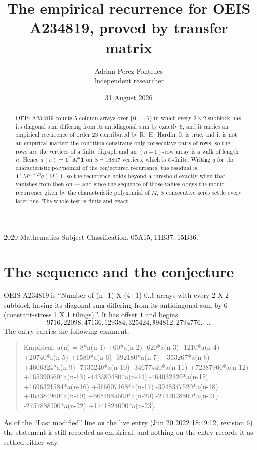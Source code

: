 \documentclass[11pt,a4paper]{article}
\title{The empirical recurrence for OEIS A234819, proved by transfer matrix}
\author{Adrian Perez Fontelles\\ \small Independent researcher}
\date{31 August 2026}
\theoremstyle{plain}
\theoremstyle{definition}
\begin{document}
\maketitle

\begin{abstract}
OEIS A234819 counts $5$-column arrays over $\{0,\dots,6\}$ in which every
$2\times2$ subblock has its diagonal sum differing from its antidiagonal sum by
exactly $6$, and it
carries an empirical recurrence of order $23$ contributed by R.~H.~Hardin. It is true,
and it is not an empirical matter: the condition constrains only consecutive pairs of rows,
so the rows are the vertices of a finite digraph and an $(n+1)$-row array is a walk of
length $n$. Hence $a(n)=\mathbf{1}^{\!\top}M^{n}\mathbf{1}$ on $S=16807$ vertices, which
is $C$-finite. Writing $q$ for the characteristic polynomial of the conjectured recurrence,
the residual is $\mathbf{1}^{\!\top}M^{\,n-23}q(M)\mathbf{1}$, so the recurrence
holds beyond a threshold exactly when that vanishes from then on --- and since the sequence
of those values obeys the monic recurrence given by the characteristic polynomial of $M$,
$S$ consecutive zeros settle every later one. The whole test is finite and exact.
\end{abstract}

\noindent\small 2020 Mathematics Subject Classification. 05A15, 11B37, 15B36.\normalsize

\section{The sequence and the conjecture}

OEIS A234819 is ``Number of (n+1) X (4+1) 0..6 arrays with every 2 X 2 subblock having its diagonal sum differing from its antidiagonal sum by 6 (constant-stress 1 X 1 tilings).''. It has offset
$1$ and begins
\[
9716, 22098, 47136, 129384, 325424, 994812, 2794776,\ \dots
\]
The entry carries the following comment:
\begin{quote}\small
Empirical: a(n) = 8*a(n-1) +60*a(n-2) -620*a(n-3) -1210*a(n-4) +20740*a(n-5) +1580*a(n-6) -392180*a(n-7) +353267*a(n-8) +4606324*a(n-9) -7135240*a(n-10) -34677440*a(n-11) +72387960*a(n-12) +165390560*a(n-13) -443380480*a(n-14) -464032320*a(n-15) +1696321584*a(n-16) +566607168*a(n-17) -3948347520*a(n-18) +465384960*a(n-19) +5084985600*a(n-20) -2142028800*a(n-21) -2757888000*a(n-22) +1741824000*a(n-23).
\end{quote}
As of the ``Last modified'' line on the live entry (Jun 20 2022 18:49:12, revision 6) the statement is
still recorded as empirical, and nothing on the entry records it as settled either way.
\end{document}

